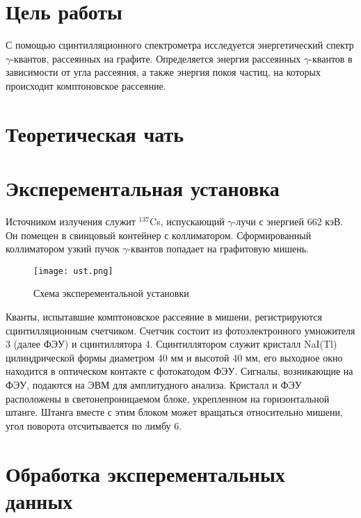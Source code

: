 


    

    \section*{Цель работы}

    С помощью сцинтилляционного спектрометра исследуется энергетический спектр $\gamma$-квантов, 
    рассеянных на графите. 
    Определяется энергия рассеянных $\gamma$-квантов в зависимости от угла рассеяния, 
    а также энергия покоя частиц, на которых происходит комптоновское рассеяние.

    \section*{Теоретическая чать}

    \section*{Эксперементальная установка}

    Источником излучения служит $^{137}$Cs, испускающий $\gamma$-лучи с энергией 662 кэВ. 
    Он помещен в свинцовый контейнер с коллиматором. 
    Сформированный коллиматором узкий пучок $\gamma$-квантов попадает на графитовую мишень.

    \begin{figure}
        \centering
        \texttt{[image: ust.png]}
        \caption{Схема эксперементальной установки}
        \label{fig:ust}
    \end{figure}

    Кванты, испытавшие комптоновское рассеяние в мишени, 
    регистрируются сцинтилляционным счетчиком. 
    Счетчик состоит из фотоэлектронного умножителя 3 (далее ФЭУ) и сцинтиллятора 4. 
    Сцинтиллятором служит кристалл NaI(Tl) цилиндрической формы диаметром 40 мм и высотой 40 мм, 
    его выходное окно находится в оптическом контакте с фотокатодом ФЭУ. 
    Сигналы, возникающие на ФЭУ, подаются на ЭВМ для амплитудного анализа. 
    Кристалл и ФЭУ расположены в светонепроницаемом блоке, укрепленном на горизонтальной штанге. 
    Штанга вместе с этим блоком может вращаться относительно мишени, 
    угол поворота отсчитывается по лимбу 6.

    \section*{Обработка эксперементальных данных}

